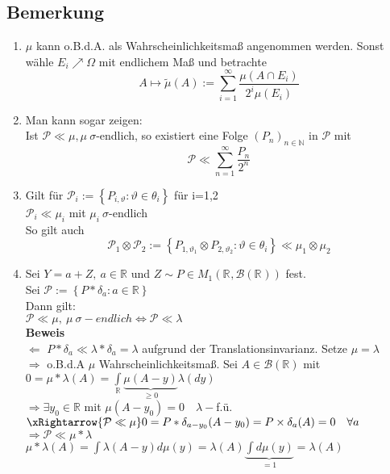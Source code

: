 \documentclass[german,10pt,oneside, fleqn, a4paper]{article}
\newcommand {\R}	{\mathbb{R}}
\newcommand {\N}	{\mathbb{N}}
\newcommand{\Ra}	{\Rightarrow}
\newcommand{\La}	{\Leftarrow}
\newcommand{\LRa}{\Leftrightarrow}
\newcommand{\sm}[2][\infty]{\sum\limits_{#2}^{#1}}
\newcommand{\brc}[1]{\left(#1\right)}
\newcommand{\brac}[1]{\left\lbrace #1\right\rbrace}
\newcommand{\folge}[3][\N]{\left(#2_#3\right)_{#3\in #1}}
\newcommand{\mc}[1]{\mathcal{#1}}
\newcommand{\beweis}{\textbf{Beweis}\\}
\newcommand{\1}[1]{1_{#1}}
\newcommand{\2}[1]{\1{\brac{#1}}}
\newcommand{\rbor}[1][d]{\brc{\R^{#1},\mc{B}\brc{\R^{#1}}}}
\newcommand{\intr}{\int\limits_\R}
\newcommand{\p}{\mc{P}}
\begin{document}
\subsection{Bemerkung}
\label{9.7}
\begin{enumerate}[label=(\roman*)]
\item $\mu$ kann o.B.d.A. als Wahrscheinlichkeitsmaß angenommen werden. Sonst wähle $E_i\nearrow\Omega$ mit endlichem Maß und betrachte\[
A\mapsto\tilde{\mu}(A):=\sm{i=1}\dfrac{\mu(A\cap E_i)}{2^i\mu(E_i)}\]
\item Man kann sogar zeigen: \\
Ist $\p\ll\mu, \mu\ \sigma$-endlich, so existiert eine Folge $\folge{P}{n}$ in $\p$ mit \[
\p\ll\sm{n=1}\dfrac{P_n}{2^n}\]
\item Gilt für $\p_i:=\brac{P_{i,\vartheta}:\vartheta\in\theta_i}$ für i=1,2 \\
$\p_i\ll\mu_i$ mit $\mu_i\ \sigma$-endlich\\
So gilt auch\[
\p_1\otimes\p_2:=\brac{P_{1,\vartheta_1}\otimes P_{2,\vartheta_2}:\vartheta\in\theta_i}\ll\mu_1\otimes\mu_2\]
\item Sei $Y=a+Z,\ a\in\R$ und $Z\sim P\in M_1\rbor[]$ fest.\\
Sei $\p:=\brac{P*\delta_a:a\in\R}$\\
Dann gilt:\\
$\p\ll\mu,\ \mu\ \sigma-endlich\LRa\p\ll\lambda$\\
\beweis
\glqq $\La$ \grqq $P*\delta_a\ll\lambda*\delta_a=\lambda$ aufgrund der Translationsinvarianz. Setze $\mu=\lambda$\\
\glqq $\Ra$ \grqq o.B.d.A $\mu$ Wahrscheinlichkeitsmaß. Sei $A\in\mc{B}(\R)$ mit\\
$0=\mu*\lambda(A)=\intr \underbrace{\mu(A-y)}_{\geq 0}\lambda(dy)$\\
$\Ra \exists y_0\in\R$ mit $\mu(A-y_0)=0\quad \lambda-$f.ü.\\
$\xRightarrow{\p\ll\mu} 0=P*\delta_{a-y_0}(A-y_0)=P\times\delta_a(A)=0\quad \forall a$\\
$\Ra \p\ll\mu*\lambda$\\
$\mu*\lambda(A)=\int \lambda(A-y)d\mu(y)=\lambda(A)\underbrace{\int d\mu(y)}_{=1}=\lambda(A)$
\end{enumerate}
\end{document}
